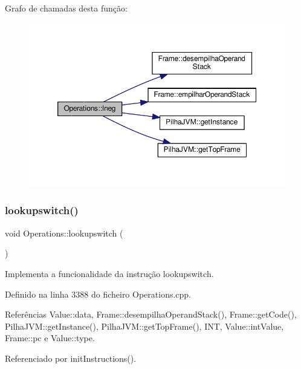 Grafo de chamadas desta função\+:\nopagebreak
\begin{figure}[H]
\begin{center}
\leavevmode
\includegraphics[width=350pt]{classOperations_a0a14cc7ee880b5d5f1c3b532e8e2117c_cgraph}
\end{center}
\end{figure}
\mbox{\label{classOperations_a0458ee466daff63a3698973c89cfe71a}} 
\subsubsection{\texorpdfstring{lookupswitch()}{lookupswitch()}}
{\footnotesize\ttfamily void Operations\+::lookupswitch (\begin{DoxyParamCaption}{ }\end{DoxyParamCaption})\hspace{0.3cm}{\ttfamily [private]}}



Implementa a funcionalidade da instrução lookupswitch. 



Definido na linha 3388 do ficheiro Operations.\+cpp.



Referências Value\+::data, Frame\+::desempilha\+Operand\+Stack(), Frame\+::get\+Code(), Pilha\+J\+V\+M\+::get\+Instance(), Pilha\+J\+V\+M\+::get\+Top\+Frame(), I\+NT, Value\+::int\+Value, Frame\+::pc e Value\+::type.



Referenciado por init\+Instructions().

